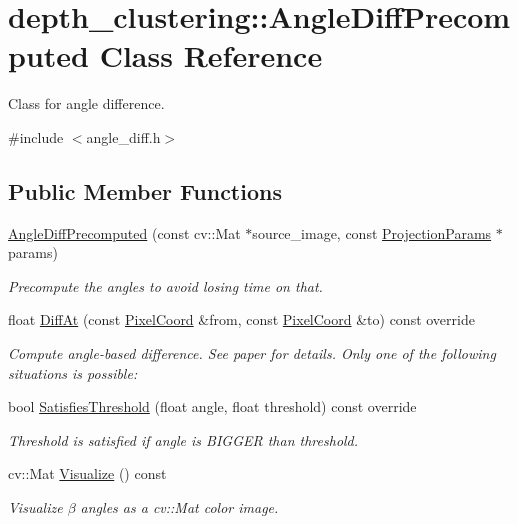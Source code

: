 \hypertarget{classdepth__clustering_1_1AngleDiffPrecomputed}{\section{depth\-\_\-clustering\-:\-:Angle\-Diff\-Precomputed Class Reference}
\label{classdepth__clustering_1_1AngleDiffPrecomputed}
}


Class for angle difference.  




{\ttfamily \#include $<$angle\-\_\-diff.\-h$>$}

\subsection*{Public Member Functions}
\begin{DoxyCompactItemize}
\item 
\hyperlink{classdepth__clustering_1_1AngleDiffPrecomputed_a0cd5a0071d191d6a4f3594a789777ff3}{Angle\-Diff\-Precomputed} (const cv\-::\-Mat $\ast$source\-\_\-image, const \hyperlink{classdepth__clustering_1_1ProjectionParams}{Projection\-Params} $\ast$params)
\begin{DoxyCompactList}\small\item\em Precompute the angles to avoid losing time on that. \end{DoxyCompactList}\item 
float \hyperlink{classdepth__clustering_1_1AngleDiffPrecomputed_ae15bb5fc9488ae2b26c77665931b8626}{Diff\-At} (const \hyperlink{structdepth__clustering_1_1PixelCoord}{Pixel\-Coord} \&from, const \hyperlink{structdepth__clustering_1_1PixelCoord}{Pixel\-Coord} \&to) const override
\begin{DoxyCompactList}\small\item\em Compute angle-\/based difference. See paper for details. Only one of the following situations is possible\-: \end{DoxyCompactList}\item 
\hypertarget{classdepth__clustering_1_1AngleDiffPrecomputed_a28a32c0cb0405163fe237909fe5f6c0c}{bool \hyperlink{classdepth__clustering_1_1AngleDiffPrecomputed_a28a32c0cb0405163fe237909fe5f6c0c}{Satisfies\-Threshold} (float angle, float threshold) const override}\label{classdepth__clustering_1_1AngleDiffPrecomputed_a28a32c0cb0405163fe237909fe5f6c0c}

\begin{DoxyCompactList}\small\item\em Threshold is satisfied if angle is B\-I\-G\-G\-E\-R than threshold. \end{DoxyCompactList}\item 
cv\-::\-Mat \hyperlink{classdepth__clustering_1_1AngleDiffPrecomputed_a35da8cd9455b3485acfd5da203ecaafb}{Visualize} () const 
\begin{DoxyCompactList}\small\item\em Visualize $\beta$ angles as a {\ttfamily cv\-::\-Mat} color image. \end{DoxyCompactList}\end{DoxyCompactItemize}
